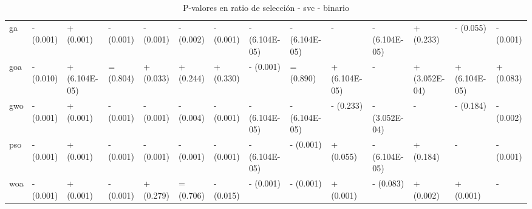 \begin{table}
\begin{adjustbox}{width=\linewidth}
\begin{tabular}{llllllllllllll}
            ga    & - (0.001)     & + (0.001)     & - (0.001)     & - (0.001)     & - (0.002)     & - (0.001)     & - (6.104E-05) & - (6.104E-05) & -             & - (6.104E-05) & + (0.233)     & - (0.055)     & - (0.001) \\
            goa   & - (0.010)     & + (6.104E-05) & = (0.804)     & + (0.033)     & + (0.244)     & + (0.330)     & - (0.001)     & = (0.890)     & + (6.104E-05) & -             & + (3.052E-04) & + (6.104E-05) & + (0.083) \\
            gwo   & - (0.001)     & + (0.001)     & - (0.001)     & - (0.001)     & - (0.004)     & - (0.001)     & - (6.104E-05) & - (6.104E-05) & - (0.233)     & - (3.052E-04) & -             & - (0.184)     & - (0.002) \\
            pso   & - (0.001)     & + (0.001)     & - (0.001)     & - (0.001)     & - (0.001)     & - (0.001)     & - (6.104E-05) & - (0.001)     & + (0.055)     & - (6.104E-05) & + (0.184)     & -             & - (0.001) \\
            woa   & - (0.001)     & + (0.001)     & - (0.001)     & + (0.279)     & = (0.706)     & - (0.015)     & - (0.001)     & - (0.001)     & + (0.001)     & - (0.083)     & + (0.002)     & + (0.001)     & -         \\
            \bottomrule
        \end{tabular}
    \end{adjustbox}
    \caption{P-valores en ratio de selección - svc - binario}
    \label{tab:p-values_sel_ratio_bin_svc}
\end{table}

